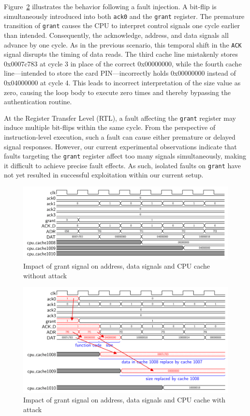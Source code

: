 Figure~\ref{fault2} illustrates the behavior following a fault injection. A bit-flip is simultaneously introduced into both \texttt{ack0} and the \texttt{grant} register. The premature transition of \texttt{grant} causes the CPU to interpret control signals one cycle earlier than intended. Consequently, the acknowledge, address, and data signals all advance by one cycle. As in the previous scenario, this temporal shift in the \texttt{ACK} signal disrupts the timing of data reads. The third cache line mistakenly stores 0x0007c783 at cycle 3 in place of the correct 0x00000000, while the fourth cache line—intended to store the card PIN—incorrectly holds 0x00000000 instead of 0x04000000 at cycle 4. This leads to incorrect interpretation of the size value as zero, causing the loop body to execute zero times and thereby bypassing the authentication routine.

At the Register Transfer Level (RTL), a fault affecting the \texttt{grant} register may induce multiple bit-flips within the same cycle. From the perspective of instruction-level execution, such a fault can cause either premature or delayed signal responses. However, our current experimental observations indicate that faults targeting the \texttt{grant} register affect too many signals simultaneously, making it difficult to achieve precise fault effects. As such, isolated faults on \texttt{grant} have not yet resulted in successful exploitation within our current setup.

\begin{figure}[t!]
  \centering
  \includegraphics[width=\linewidth]{Chapitre4/figures/nofault2.png}
  \caption{Impact of grant signal on address, data signals and CPU cache without attack}
  \label{nofault2}
\end{figure}

\begin{figure}[t!]
  \centering
  \includegraphics[width=\linewidth]{Chapitre4/figures/fault2.png}
  \caption{Impact of grant signal on address, data signals and CPU cache with attack}
  \label{fault2}
\end{figure}


